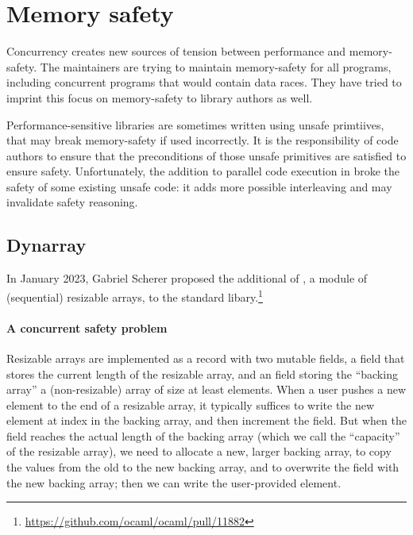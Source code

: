 \section{Memory safety}

Concurrency creates new sources of tension between performance and memory-safety. The \OCaml maintainers are trying to maintain memory-safety for all \OCaml programs, including concurrent programs that would contain data races. They have tried to imprint this focus on memory-safety to library authors as well.

Performance-sensitive \OCaml libraries are sometimes written using unsafe primtiives, that may break memory-safety if used incorrectly. It is the responsibility of code authors to ensure that the preconditions of those unsafe primitives are satisfied to ensure safety. Unfortunately, the addition to parallel code execution in \OCamlFive broke the safety of some existing unsafe code: it adds more possible interleaving and may invalidate safety reasoning.

\subsection{Dynarray} In January 2023, Gabriel Scherer proposed the additional of , a module of (sequential) resizable arrays, to the \OCaml standard libary.\footnote{\url{https://github.com/ocaml/ocaml/pull/11882}} 

\paragraph{A concurrent safety problem}

Resizable arrays are implemented as a record with two mutable fields, a  field that stores the current length of the resizable array, and an  field storing the ``backing array'' a (non-resizable) array of size at least  elements. When a user pushes a new element to the end of a resizable array, it typically suffices to write the new element at index  in the backing array, and then increment the  field. But when the  field reaches the actual length of the backing array (which we call the ``capacity'' of the resizable array), we need to allocate a new, larger backing array, to copy the values from the old to the new backing array, and to overwrite the  field with the new backing array; then we can write the user-provided element.

